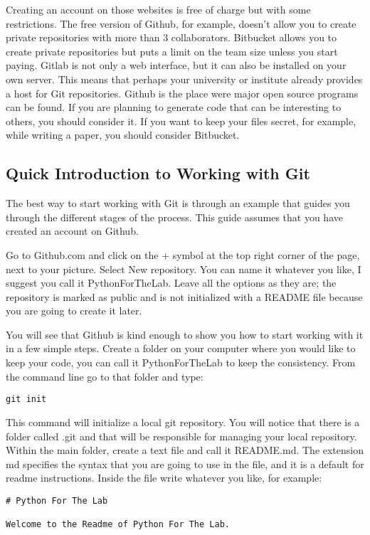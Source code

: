 Creating an account on those websites is free of charge but with some restrictions. The free version of Github, for example, doesn’t allow you to create private repositories with more than 3 collaborators. Bitbucket allows you to create private repositories but puts a limit on the team size unless you start paying. Gitlab is not only a web interface, but it can also be installed on your own server. This means that perhaps your university or institute already provides a host for Git repositories. Github is the place were major open source programs can be found. If you are planning to generate code that can be interesting to others, you should consider it. If you want to keep your files secret, for example, while writing a paper, you should consider Bitbucket.

\subsection{Quick Introduction to Working with Git}
The best way to start working with Git is through an example that guides you through the different stages of the process. This guide assumes that you have created an account on Github.

Go to Github.com and click on the + symbol at the top right corner of the page, next to your picture. Select New repository. You can name it whatever you like, I suggest you call it PythonForTheLab. Leave all the options as they are; the repository is marked as public and is not initialized with a README file because you are going to create it later.

You will see that Github is kind enough to show you how to start working with it in a few simple steps. Create a folder on your computer where you would like to keep your code, you can call it PythonForTheLab to keep the consistency. From the command line go to that folder and type:
\begin{verbatim}
git init
\end{verbatim}
This command will initialize a local git repository. You will notice that there is a folder called .git and that will be responsible for managing your local repository. Within the main folder, create a text file and call it README.md. The extension md specifies the syntax that you are going to use in the file, and it is a default for readme instructions. Inside the file write whatever you like, for example:
\begin{verbatim}
# Python For The Lab

Welcome to the Readme of Python For The Lab. 
\end{verbatim}

